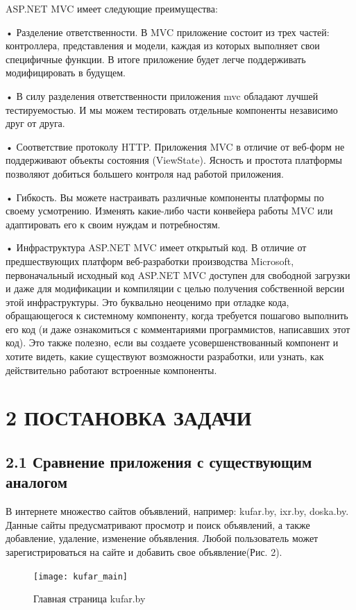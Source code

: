 \documentclass[14pt,a4paper]{extreport}
\begin{document}
	\parindent=1cm ASP.NET MVC имеет следующие преимущества:\par
	• Разделение ответственности. В MVC приложение состоит из трех частей: контроллера, представления и модели, каждая из которых выполняет свои специфичные функции. В итоге приложение будет легче поддерживать модифицировать в будущем.\par
	• В силу разделения ответственности приложения mvc обладают лучшей тестируемостью. И мы можем тестировать отдельные компоненты независимо друг от друга.\par
	• Соответствие протоколу HTTP. Приложения MVC в отличие от веб-форм не поддерживают объекты состояния (ViewState). Ясность и простота платформы позволяют добиться большего контроля над работой приложения.\par
	• Гибкость. Вы можете настраивать различные компоненты платформы по своему усмотрению. Изменять какие-либо части конвейера работы MVC или адаптировать его к своим нуждам и потребностям.\par
	• Инфраструктура ASP.NET MVC имеет открытый код. В отличие от предшествующих платформ веб-разработки производства Microsoft, первоначальный исходный код ASP.NET MVC доступен для свободной загрузки и даже для модификации и компиляции с целью получения собственной версии этой инфраструктуры. Это буквально неоценимо при отладке кода, обращающегося к системному компоненту, когда требуется пошагово выполнить его код (и даже ознакомиться с комментариями программистов, написавших этот код). Это также полезно, если вы создаете усовершенствованный компонент и хотите видеть, какие существуют возможности разработки, или узнать, как действительно работают встроенные компоненты.\par

	
	\newpage
	\section*{\normalsize\hspace{4ex}2 ПОСТАНОВКА ЗАДАЧИ}
	\subsection*{\normalsize\hspace{4ex}2.1 Сравнение приложения с существующим аналогом}
	\hspace{4ex} В интернете множество сайтов объявлений, например: kufar.by, ixr.by, doska.by. Данные сайты предусматривают просмотр и поиск объявлений, а также добавление, удаление, изменение объявления. Любой пользователь может зарегистрироваться на сайте и добавить свое объявление(Рис. 2).
	\begin{figure}[h]
	\begin{center}
	\texttt{[image: kufar\_main]}
	\caption{Главная страница kufar.by}
	\end{center}
	\end{figure}
	
\end{document}
